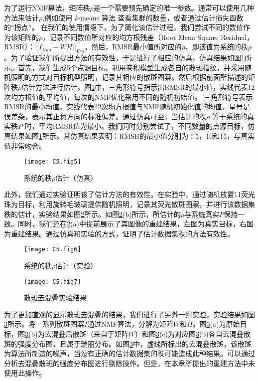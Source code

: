 为了运行NMF算法，矩阵秩$\rho$是一个需要预先确定的唯一参数。通常可以使用几种方法来估计$\rho$,例如使用 \textsl{k}-means 算法 \cite{Moretti2020a} 查看集群的数量，或者通过估计损失函数的“拐点”\cite{boniface_non_invasive_2020,hutchins_position_dependent_2008}。
在我们的使用情境下，为了简化该估计过程，我们尝试不同的数值作为该矩阵的$\rho$，记录不同数值所对应的均方根残差（Root Mean Square Residual，RMSR）：$\vert\vert I_{fluo}-WH \vert\vert_{Fro}$。然后，RMSR最小值所对应的$\rho$，即该值为系统的秩$\rho$。为了验证我们所提出方法的有效性，于是进行了相应的仿真，仿真结果如图\ref{fig:5.5}所示。首先，我们生成5个点源目标，利用卷积模型生成各自的散斑指纹，并采用随机照明的方式对目标机型照明，记录其相应的散斑图案。然后根据前面所描述的矩阵秩$\rho$估计方法进行估计。图\ref{fig:5.5}中，三角形符号指示出RMSR的最小值，实线代表12次均方根值的平均值，每次的NMF优化采用不同的随机初始值。
三角形符号表示RMSR的最小均值，实线代表12次均方根值与NMF随机初始化值的均值，星号是误差条，表示其正负方向的标准偏差。通过仿真可至，当估计的秩$\rho$ 等于系统的真实秩$P$ 时，平均RMSR值为最小。我们同时分别尝试了，不同数量的点源目标，仿真结果如图\ref{fig:5.5}所示。其仿真结果表明：RMSR的最小值分别为：5，10和15，与真实值非常吻合。

\begin{figure}[htp]
	\centering
	\texttt{[image: C5.fig5]}
	\caption{系统的秩$\rho$估计（仿真）}
	\label{fig:5.5}
\end{figure}

此外，我们通过实验证明该了估计方法的有效性。在实验中，通过随机放置11荧光珠为目标，利用旋转毛玻璃提供随机照明，记录其荧光散斑图案，并进行该数据集秩的估计，实验结果如图\ref{fig:5.6}所示。如图\ref{fig:5.6}(b)所示，所估计的$\rho$与系统真实$P$保持一致。同时，我们还在\ref{fig:5.6}(a)中提前展示了其图像的重建结果，左图为真实目标，右图为重建结果。通过仿真和实验的方式，证明了估计数据集秩的方法有效性。

\begin{figure}[htp]
	\centering
	\texttt{[image: C5.fig6]}
	\caption{系统的秩$\rho$估计（实验）}
	\label{fig:5.6}
\end{figure}

\begin{figure}[htp]
	\centering
	\texttt{[image: C5.fig7]}
	\caption{散斑去混叠实验结果}
	\label{fig:5.7}
\end{figure}

为了更加直观的显示散斑去混叠的结果，我们进行了另外一组实验，实验结果如图\ref{fig:5.7}所示。将一系列散斑图案$I$通过NMF算法，分解为矩阵$W$和$H$。图\ref{fig:5.7}(a)为原始目标，图\ref{fig:5.7}(b)为去混叠后散斑（来自于矩阵$W$）和图\ref{fig:5.7}(c)为对应图\ref{fig:5.7}(b)各自去混叠散斑的强度分布图，且属于瑞丽分布。如图\ref{fig:5.7}中，虚线所标出的去混叠散斑，该散斑为算法所制造的噪声，当没有正确的估计数据集的秩可能造成此种结果。可以通过分析去混叠散斑的强度分布图进行剔除操作。但是，在本章所提出的重建方法中未使用此操作。

